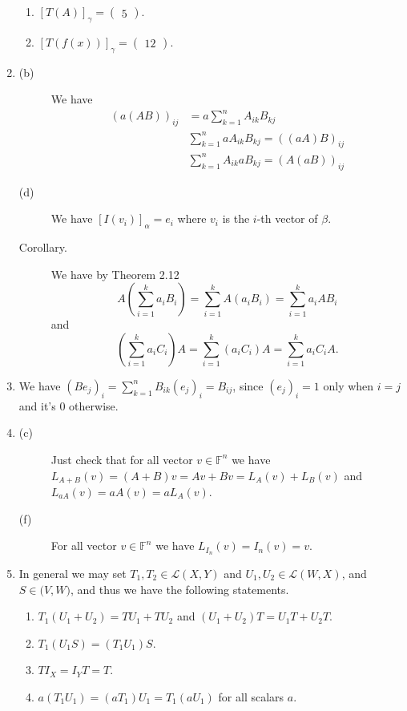 \begin{enumerate}
\begin{enumerate}
\item $[T(A)]_{\gamma}=\left(\begin{array}{c}5\end{array}\right).$
\item $[T(f(x))]_{\gamma}=\left(\begin{array}{c}12\end{array}\right).$
\end{enumerate}
\item \begin{description}
\item[(b)] We have 
\begin{align*}
(a(AB))_{ij}&=a\sum_{k=1}^n{A_{ik}B_{kj}}\\
&\sum_{k=1}^n{aA_{ik}B_{kj}}=((aA)B)_{ij}\\
&\sum_{k=1}^n{A_{ik}aB_{kj}}=(A(aB))_{ij}
\end{align*}
\item[(d)] We have $[I(v_i)]_{\alpha}=e_i$ where $v_i$ is the $i$-th vector of $\beta $.
\item[Corollary.] We have by Theorem 2.12
\[A(\sum_{i=1}^k{a_iB_i})=\sum_{i=1}^k{A(a_iB_i)}=\sum_{i=1}^k{a_iAB_i}\]
and
\[(\sum_{i=1}^k{a_iC_i})A=\sum_{i=1}^k{(a_iC_i)A}=\sum_{i=1}^k{a_iC_iA}.\]
\end{description}
\item We have $(Be_j)_i=\sum_{k=1}^n{B_{ik}(e_j)_i}=B_{ij}$, since $(e_j)_i=1$ only when $i=j$ and it's $0$ otherwise.
\item \begin{description}
\item[(c)] Just check that for all vector $v\in \mathbb{F}^n$ we have $L_{A+B}(v)=(A+B)v=Av+Bv=L_A(v)+L_B(v)$ and $L_{aA}(v)=aA(v)=aL_A(v)$.
\item[(f)] For all vector $v\in \mathbb{F}^n$ we have $L_{I_n}(v)=I_n(v)=v$.
\end{description}
\item In general we may set $T_1,T_2\in \mathcal{L}(X,Y)$ and $U_1,U_2\in \mathcal{L}(W,X)$, and $S\in \mathcal(V,W)$, and thus we have the following statements.
\begin{enumerate}
\item $T_1(U_1+U_2)=TU_1+TU_2$ and $(U_1+U_2)T=U_1T+U_2T$.
\item $T_1(U_1S)=(T_1U_1)S$.
\item $TI_X=I_YT=T$.
\item $a(T_1U_1)=(aT_1)U_1=T_1(aU_1)$ for all scalars $a$.
\end{enumerate}

\end{enumerate}
